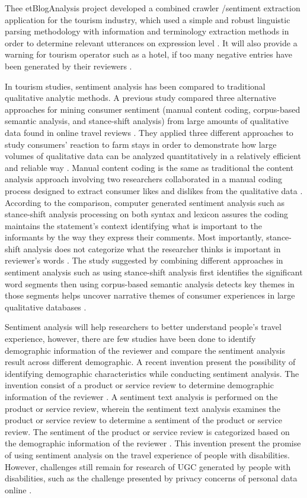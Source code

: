 Thee etBlogAnalysis project developed a combined crawler /sentiment extraction application for the tourism industry, which used a simple and robust linguistic parsing methodology with information and terminology extraction methods in order to determine relevant utterances on expression level \cite{opinion2014}. It will also provide a warning for tourism operator such as a hotel, if too many negative entries have been generated by their reviewers \cite{Garcia2012}.

In tourism studies, sentiment analysis has been compared to traditional qualitative analytic methods. A previous study compared three alternative approaches for mining consumer sentiment (manual content coding, corpus-based semantic analysis, and stance-shift analysis) from large amounts of qualitative data found in online travel reviews \cite{Farm}. They applied three different approaches to study consumers' reaction to farm stays in order to demonstrate how large volumes of qualitative data can be analyzed quantitatively in a relatively efficient and reliable way \cite{Farm}.  Manual content coding is the same as traditional the content analysis approach involving two researchers collaborated in a manual coding process designed to extract consumer likes and dislikes from the qualitative data \cite{Farm}. According to the comparison, computer generated sentiment analysis such as stance-shift analysis processing on both syntax and lexicon assures the coding maintains the statement's context identifying what is important to the informants by the way they express their comments. Most importantly, stance-shift analysis does not categorize what the researcher thinks is important in reviewer's words \cite{Farm}. The study suggested by combining different approaches in sentiment analysis such as using stance-shift analysis first identifies the significant word segments then using corpus-based semantic analysis detects key themes in those segments helps uncover narrative themes of consumer experiences in large qualitative databases \cite{Farm}.

Sentiment analysis will help researchers to better understand people's travel experience, however, there are few studies have been done to identify demographic information of the reviewer and compare the sentiment analysis result across different demographic. A recent invention present the possibility of identifying demographic characteristics while conducting sentiment analysis. The invention consist of a product or service review to determine demographic information of the reviewer \cite{Bhatt2014}. A sentiment text analysis is performed on the product or service review, wherein the sentiment text analysis examines the product or service review to determine a sentiment of the product or service review. The sentiment of the product or service review is categorized based on the demographic information of the reviewer \cite{Bhatt2014}. This invention present the promise of using sentiment analysis on the travel experience of people with disabilities. However, challenges still remain for research of UGC generated by people with disabilities, such as the challenge presented by privacy concerns of personal data online \cite{lazar}. 


